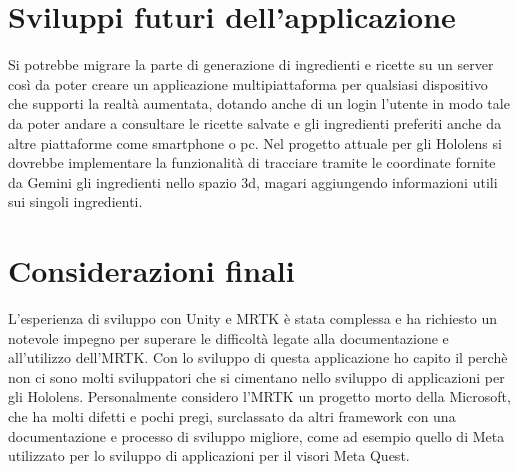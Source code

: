 \section{Sviluppi futuri dell'applicazione}
Si potrebbe migrare la parte di generazione di ingredienti e ricette su un server così da poter creare un applicazione multipiattaforma per qualsiasi dispositivo che supporti la realtà aumentata, dotando anche di un login l'utente in modo tale da poter andare a consultare le ricette salvate e gli ingredienti preferiti anche da altre piattaforme come smartphone o pc. Nel progetto attuale per gli Hololens si dovrebbe implementare la funzionalità di tracciare tramite le coordinate fornite da Gemini gli ingredienti nello spazio 3d, magari aggiungendo informazioni utili sui singoli ingredienti.

\section{Considerazioni finali}
L'esperienza di sviluppo con Unity e MRTK è stata complessa e ha richiesto un notevole impegno per superare le difficoltà legate alla documentazione e all'utilizzo dell'MRTK. Con lo sviluppo di questa applicazione ho capito il perchè non ci sono molti sviluppatori che si cimentano nello sviluppo di applicazioni per gli Hololens. Personalmente considero l'MRTK un progetto morto della Microsoft, che ha molti difetti e pochi pregi, surclassato da altri framework con una documentazione e processo di sviluppo migliore, come ad esempio quello di Meta utilizzato per lo sviluppo di applicazioni per il visori Meta Quest.